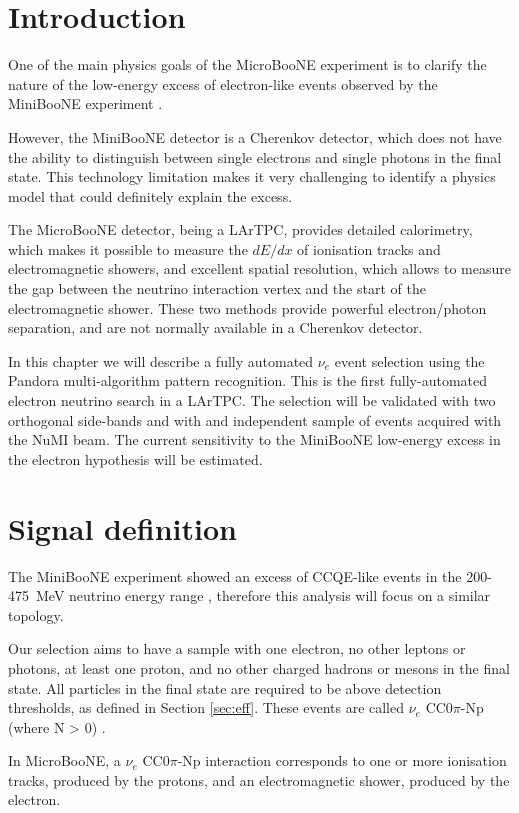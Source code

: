 \section{Introduction}
One of the main physics goals of the MicroBooNE experiment is to clarify the nature of the low-energy excess of electron-like events observed by the MiniBooNE experiment \cite{Aguilar-Arevalo:2018gpe}. 

However, the MiniBooNE detector is a Cherenkov detector, which does not have the ability to distinguish between single electrons and single photons in the final state. This technology limitation makes it very challenging to identify a physics model that could definitely explain the excess.

The MicroBooNE detector, being a LArTPC, provides detailed  calorimetry, which makes it possible to measure the $dE/dx$ of ionisation tracks and electromagnetic showers, and excellent spatial resolution, which allows to measure the gap between the neutrino interaction vertex and the start of the electromagnetic shower. These two methods provide powerful electron/photon separation, and are not normally available in a Cherenkov detector. 

In this chapter we will describe a fully automated $\nu_{e}$ event selection using the Pandora multi-algorithm pattern recognition. This is the first fully-automated electron neutrino search in a LArTPC. The selection will be validated with two orthogonal side-bands and with and independent sample of events acquired with the NuMI beam. The current sensitivity to the MiniBooNE low-energy excess in the electron hypothesis will be estimated.

\section{Signal definition}
The MiniBooNE experiment showed an excess of CCQE-like events in the 200-475~MeV neutrino energy range \cite{Aguilar-Arevalo:2018gpe}, therefore this analysis will focus on a similar topology.

Our selection aims to have a sample with one electron, no other leptons or photons, at least one proton, and no other charged hadrons or mesons in the final state. All particles in the final state are required to be above detection thresholds, as defined in Section \ref{sec:eff}. These events are called $\nu_{e}$ CC0$\pi$-Np (where N > 0) \cite{Katori:2013nca}. 

In MicroBooNE, a $\nu_{e}$ CC0$\pi$-Np interaction corresponds to one or more ionisation tracks, produced by the protons, and an electromagnetic shower, produced by the electron. 

